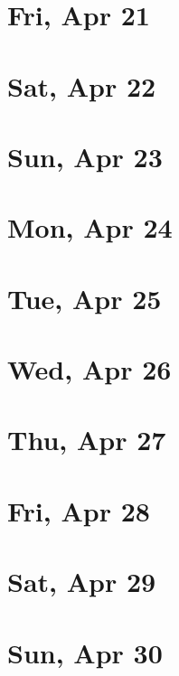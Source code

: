 	\section{Fri, Apr 21}
		
	\section{Sat, Apr 22}
		
	\section{Sun, Apr 23}
		
	\section{Mon, Apr 24}
		
	\section{Tue, Apr 25}
		
	\section{Wed, Apr 26}
		
	\section{Thu, Apr 27}
		
	\section{Fri, Apr 28}
		
	\section{Sat, Apr 29}
		
	\section{Sun, Apr 30}
		
